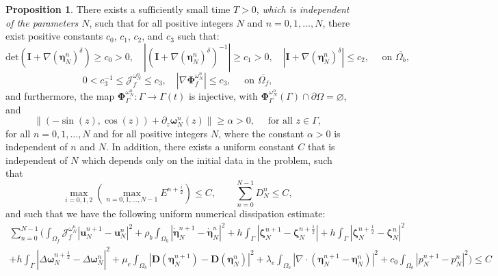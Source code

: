 \documentclass[11pt]{article}
\newcommand{\bd}{\boldsymbol}
\theoremstyle{definition}
\newtheorem{proposition}{Proposition}[section]
\begin{document}
\begin{proposition}\label{geometricN}
There exists a sufficiently small time $T > 0$, \textit{which is independent of the parameters $N$}, such that for all positive integers $N$ and $n = 0, 1, ..., N$, there exist positive constants $c_{0}$, $c_{1}$, $c_{2}$, and $c_{3}$ such that:
\begin{equation}\label{uniformgeom1}
\text{det}(\bd{I} + \nabla (\bd{\eta}^{n}_{N})^{\delta}) \ge c_{0} > 0, \quad |(\bd{I} + \nabla(\bd{\eta}^{n}_{N})^{\delta})^{-1}| \ge c_{1} > 0, \quad |\bd{I} + \nabla (\bd{\eta}^{n}_{N})^{\delta}| \le c_{2}, \quad \text{ on } \overline{\Omega_{b}},
\end{equation}
\begin{equation}\label{uniformgeom2}
0 < c_{3}^{-1} \le \mathcal{J}^{\omega^{n}_{N}}_{f} \le c_{3}, \quad |\nabla \bd{\Phi}^{\omega^{n}_{N}}_{f}| \le c_{3}, \quad \text{ on } \overline{\Omega_{f}},
\end{equation}
and furthermore, the map $\bd{\Phi}^{\omega^{n}_{N}}_{\Gamma}: \Gamma \to \Gamma(t)$ is injective, with $\bd{\Phi}^{\omega^{n}_{N}}_{\Gamma}(\Gamma) \cap \partial \Omega = \varnothing$, and 
\begin{equation}\label{tnorm}
\|(-\sin(z), \cos(z)) + \partial_{z} \bd{\omega}^{n}_{N}(z)\| \ge \alpha > 0, \quad \text{ for all } z \in \Gamma,
\end{equation}
for all $n = 0, 1, ..., N$ and for all positive integers $N$, where the constant $\alpha > 0$ is independent of $n$ and $N$. In addition, there exists a uniform constant $C$ that is independent of $N$ which depends only on the initial data in the problem, such that
\begin{equation}\label{energyN}
\max_{i = 0, 1, 2}\left(\max_{n = 0, 1, ..., N - 1} E^{n + \frac{i}{2}}\right) \le C, \qquad \sum_{n = 0}^{N - 1} D^{n}_{N} \le C,
\end{equation}
and such that we have the following uniform numerical dissipation estimate:
\begin{multline}\label{numerdiss}
\sum_{n = 0}^{N - 1} \Bigg(\int_{\Omega_{f}} \mathcal{J}^{\omega^{n}_{N}}_{f} |\bd{u}^{n + 1}_{N} - \bd{u}^{n}_{N}|^{2} + \rho_{b} \int_{\Omega_{b}} |\dot{\bd{\eta}}^{n + 1}_{N} - \dot{\bd{\eta}}^{n}_{N}|^{2} + h\int_{\Gamma} |\bd{\zeta}^{n + 1}_{N} - \bd{\zeta}^{n + \frac{1}{2}}_{N}| + h\int_{\Gamma} |\bd{\zeta}^{n + \frac{1}{2}}_{N} - \bd{\zeta}^{n}_{N}|^{2} \\
+ h \int_{\Gamma} |\Delta \bd{\omega}^{n + \frac{1}{2}}_{N} - \Delta \bd{\omega}^{n}_{N}|^{2} + \mu_{e} \int_{\Omega_{b}} |\bd{D}(\bd{\eta}^{n + 1}_{N}) - \bd{D}(\bd{\eta}^{n}_{N})|^{2} + \lambda_{e} \int_{\Omega_{b}} |\nabla \cdot (\bd{\eta}^{n + 1}_{N} - \bd{\eta}^{n}_{N})|^{2} + c_{0} \int_{\Omega_{b}} |p^{n + 1}_{N} - p^{n}_{N}|^{2}\Bigg) \le C

\end{multline}
\end{proposition}
\end{document}
